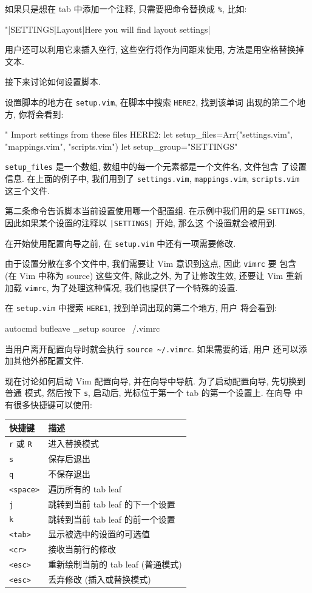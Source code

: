 如果只是想在 tab 中添加一个注释, 只需要把命令替换成 \verb'%', 比如:
\begin{vimcode}
"|SETTINGS|Layout|Here you will find layout settings|%
\end{vimcode}
用户还可以利用它来插入空行, 这些空行将作为间距来使用, 方法是用空格替换掉文本.

接下来讨论如何设置脚本.

设置脚本的地方在 \texttt{setup.vim}, 在脚本中搜索 \texttt{HERE2}, 找到该单词
出现的第二个地方, 你将会看到:
\begin{vimcode}
" Import settings from these files HERE2:
let setup_files=Arr("settings.vim", "mappings.vim", "scripts.vim")
let setup_group="SETTINGS"
\end{vimcode}

\texttt{setup\_files} 是一个数组, 数组中的每一个元素都是一个文件名, 文件包含
了设置信息. 在上面的例子中, 我们用到了 \texttt{settings.vim},
\texttt{mappings.vim}, \texttt{scripts.vim} 这三个文件.

第二条命令告诉脚本当前设置使用哪一个配置组. 在示例中我们用的是
\texttt{SETTINGS}, 因此如果某个设置的注释以 \texttt{|SETTINGS|} 开始, 那么这
个设置就会被用到.

在开始使用配置向导之前, 在 \texttt{setup.vim} 中还有一项需要修改.

由于设置分散在多个文件中, 我们需要让 Vim 意识到这点, 因此 \texttt{vimrc} 要
包含 (在 Vim 中称为 source) 这些文件, 除此之外, 为了让修改生效, 还要让 Vim
重新加载 \texttt{vimrc}, 为了处理这种情况, 我们也提供了一个特殊的设置.

在 \texttt{setup.vim} 中搜索 \texttt{HERE1}, 找到单词出现的第二个地方, 用户
将会看到:
\begin{vimcode}
autocmd bufleave _setup source ~/.vimrc
\end{vimcode}
当用户离开配置向导时就会执行 \verb'source ~/.vimrc'. 如果需要的话, 用户
还可以添加其他外部配置文件.

现在讨论如何启动 Vim 配置向导, 并在向导中导航. 为了启动配置向导, 先切换到普通
模式, 然后按下 \texttt{s}, 启动后, 光标位于第一个 tab 的第一个设置上. 在向导
中有很多快捷键可以使用:
\begin{center}
  \begin{tabular}{ll}
    \hline
	快捷键  & 描述 \\
    \hline
    \texttt{r} 或 \texttt{R}  & 进入替换模式 \\
	\texttt{s} & 保存后退出 \\
	\texttt{q} & 不保存退出 \\
	\texttt{<space>} & 遍历所有的 tab leaf \\
	\texttt{j} & 跳转到当前 tab leaf 的下一个设置 \\
	\texttt{k} & 跳转到当前 tab leaf 的前一个设置 \\
	\texttt{<tab>} & 显示被选中的设置的可选值 \\
	\texttt{<cr>} & 接收当前行的修改 \\
	\texttt{<esc>} & 重新绘制当前的 tab leaf (普通模式) \\
	\texttt{<esc>} & 丢弃修改 (插入或替换模式) \\
	\hline
  \end{tabular}
\end{center}

